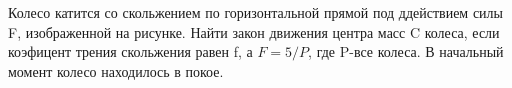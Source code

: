 Колесо катится со скольжением по горизонтальной прямой под ддействием силы F, изображенной на рисунке. Найти закон движения центра масс C колеса, если коэфицент трения 
скольжения равен f, а $F=5/P$, где P-все колеса. В начальный момент колесо находилось в покое.